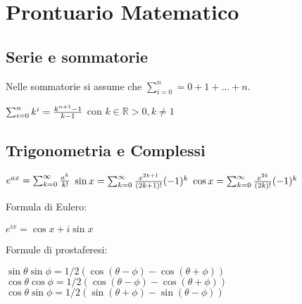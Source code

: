 \documentclass[a4paper,portrait,12pt]{article}
\theoremstyle{definition}
\begin{document}
\section{Prontuario Matematico}

\subsection{Serie e sommatorie}
Nelle sommatorie si assume che $\sum_{i = 0}^n = 0 + 1 + ... + n$. 
\begin{center}
$\sum_{i = 0}^n k^i = {k^{n+1} - 1 \over k - 1}$ con $k \in \mathbb{R} > 0, k \neq 1$
\end{center}

\subsection{Trigonometria e Complessi}
\begin{center}
$e^{a x} = \sum_{k = 0}^{\infty}{a^k \over k!}$\qquad
$\sin x = \sum_{k = 0}^{\infty}{x^{2k+1} \over (2k+1)!}(-1)^k$\qquad
$\cos x = \sum_{k = 0}^{\infty}{x^{2k} \over (2k)!}(-1)^k$
\end{center}
Formula di Eulero: 
\begin{center}
$e^{ix} = \cos x + i\sin x$
\end{center}
Formule di prostaferesi:
\begin{center}
$\sin \theta \sin \phi = 1/2(\cos (\theta - \phi) - \cos (\theta + \phi))$\\
$\cos \theta \cos \phi = 1/2(\cos (\theta - \phi) - \cos (\theta + \phi))$\\
$\cos \theta \sin \phi = 1/2(\sin (\theta + \phi) - \sin (\theta - \phi))$
\end{center}
\end{document}
